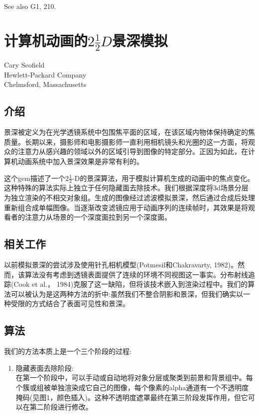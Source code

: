 \begin{CJK}{UTF8}{gbsn}
See also G1, 210.


\newpage

\section{计算机动画的$2\frac{1}{2}D$景深模拟}

\begin{center}
\small{
Cary Scofield  \\
Hewlett-Packard Company\\
Chelmsford, Massachusetts           }
\end{center}

\subsection*{介绍}

景深被定义为在光学透镜系统中包围焦平面的区域，在该区域内物体保持确定的焦质量。长期以来，摄影师和电影摄影师一直利用相机镜头和光圈的这一方面，将观众的注意力从感兴趣的领域以外的区域引导到图像的特定部分。正因为如此，在计算机动画系统中加入景深效果是非常有利的。

这个gem描述了一个$2 \frac{1}{2}$-D的景深算法，用于模拟计算机生成的动画中的焦点变化。这种特殊的算法实际上独立于任何隐藏面去除技术。我们根据深度将3d场景分层为独立渲染的不相交对象组。生成的图像经过滤波模拟景深，然后通过合成后处理重新组合成单幅图像。当逐渐改变滤镜应用于动画序列的连续帧时，其效果是将观看者的注意力从场景的一个深度面拉到另一个深度面。


\subsection*{相关工作}
以前模拟景深的尝试涉及使用针孔相机模型(Potmesil和Chakravarty, 1982)。然而，该算法没有考虑到透镜表面提供了连续的环境不同视图这一事实。分布射线追踪(Cook et al.， 1984)克服了这一缺陷，但将该技术嵌入到渲染过程中。我们的算法可以被认为是这两种方法的折中:虽然我们不整合阴影和景深，但我们确实以一种受限的方式结合了表面可见性和景深。


\subsection*{算法}
我们的方法本质上是一个三个阶段的过程:

\begin{enumerate}
	\item 隐藏表面去除阶段:\\
	在第一个阶段中，可以手动或自动地将对象分层或聚类到前景和背景组中。每个簇或组被单独渲染成它自己的图像，每个像素的alpha通道有一个不透明度掩码(见图1，颜色插入)。这种不透明度遮罩最终在第三阶段发挥作用，但它可以在第二阶段进行修改。


\end{enumerate}
\end{CJK}
